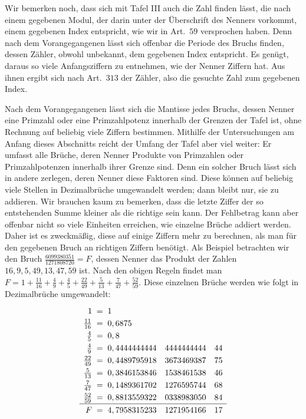 Wir bemerken noch, dass sich mit Tafel III auch die Zahl finden lässt, die nach einem gegebenen Modul, der darin unter der Überschrift des Nenners vorkommt, einem gegebenen Index entspricht, wie wir in Art.\ \(59\) versprochen haben. Denn nach dem Vorangegangenen lässt sich offenbar die Periode des Bruchs finden, dessen Zähler, obwohl unbekannt, dem gegebenen Index entspricht. Es genügt, daraus so viele Anfangsziffern zu entnehmen, wie der Nenner Ziffern hat. Aus ihnen ergibt sich nach Art.\ \(313\) der Zähler, also die gesuchte Zahl zum gegebenen Index.

Nach dem Vorangegangenen lässt sich die Mantisse jedes Bruchs, dessen Nenner eine Primzahl oder eine Primzahlpotenz innerhalb der Grenzen der Tafel ist, ohne Rechnung auf beliebig viele Ziffern bestimmen. Mithilfe der Untersuchungen am Anfang dieses Abschnitts reicht der Umfang der Tafel aber viel weiter: Er umfasst alle Brüche, deren Nenner Produkte von Primzahlen oder Primzahlpotenzen innerhalb ihrer Grenze sind. Denn ein solcher Bruch lässt sich in andere zerlegen, deren Nenner diese Faktoren sind. Diese können auf beliebig viele Stellen in Dezimalbrüche umgewandelt werden; dann bleibt nur, sie zu addieren. Wir brauchen kaum zu bemerken, dass die letzte Ziffer der so entstehenden Summe kleiner als die richtige sein kann. Der Fehlbetrag kann aber offenbar nicht so viele Einheiten erreichen, wie einzelne Brüche addiert werden. Daher ist es zweckmäßig, diese auf einige Ziffern mehr zu berechnen, als man für den gegebenen Bruch an richtigen Ziffern benötigt. Als Beispiel betrachten wir den Bruch \(\frac{6099380351}{1271808720}=F\), dessen Nenner das Produkt der Zahlen
\(16,\allowbreak 9,\allowbreak 5,\allowbreak 49,\allowbreak 13,\allowbreak 47,\allowbreak 59\) ist. Nach den obigen Regeln findet man \(F=1+\frac{11}{16}+\frac49+\frac45+\frac{22}{49}+\frac5{13}+\frac7{47}+\frac{52}{59}\). Diese einzelnen Brüche werden wie folgt in Dezimalbrüche umgewandelt:
\[\renewcommand{\arraystretch}{1.25}\begin{array}{r@{\;}c@{\;}l@{\quad}l@{\quad}l}
1&{}={}&1&&\\
\frac{11}{16}&{}={}&0,6875&&\\
\frac45&{}={}&0,8&&\\
\frac49&{}={}&0,4444444444&4444444444&44\\
\frac{22}{49}&{}={}&0,4489795918&3673469387&75\\
\frac5{13}&{}={}&0,3846153846&1538461538&46\\
\frac7{47}&{}={}&0,1489361702&1276595744&68\\
\frac{52}{59}&{}={}&0,8813559322&0338983050&84\\\hline
F&{}={}&4,7958315233&1271954166&17
\end{array}\]
